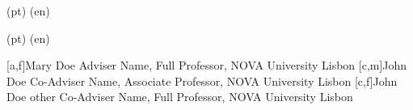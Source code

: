 \ntspecialization(pt){}
\ntspecialization(en){}

\ntsponsors(pt){}
\ntsponsors(en){}




[a,f]{Mary Doe Adviser Name, Full Professor, NOVA University Lisbon}
[c,m]{John Doe Co-Adviser Name, Associate Professor, NOVA University Lisbon}
[c,f]{John Doe other Co-Adviser Name, Full Professor, NOVA University Lisbon}

